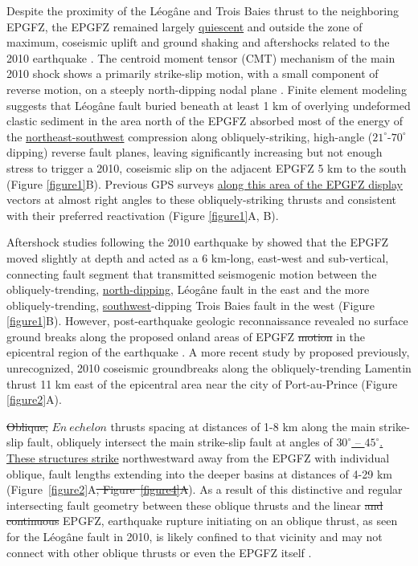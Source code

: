 \documentclass[linenumbers,draft]{agujournal}
\begin{document}
Despite the proximity of the L\'eog\^ane and Trois Baies thrust to the neighboring EPGFZ, the EPGFZ remained largely \ul{quiescent} and outside the zone of maximum, coseismic uplift and ground shaking and aftershocks related to the 2010 earthquake \citep{nettles2010earthquake}. The centroid moment tensor (CMT) mechanism of the main 2010 shock shows a primarily strike-slip motion, with a small component of reverse motion, on a steeply north-dipping nodal plane \citep{nettles2010earthquake,douilly2013crustal}. Finite element modeling \citep{douilly2015three} suggests that L\'eog\^ane fault buried beneath at least 1 km of overlying undeformed clastic sediment in the area north of the EPGFZ absorbed most of the energy of the \ul{northeast-southwest} compression along obliquely-striking, high-angle ($21^{\circ}$-$70^{\circ}$ dipping) reverse fault planes, leaving significantly increasing but not enough stress to trigger a 2010, coseismic slip on the adjacent EPGFZ 5 km to the south (Figure \ref{figure1}B). Previous GPS surveys \underline{\citep{calais2010transpressional,calais2016plate}}\ul{ along this area of the EPGFZ display} vectors at almost right angles to these obliquely-striking thrusts and consistent with their preferred reactivation (Figure \ref{figure1}A, B).

Aftershock studies following the 2010 earthquake by \citet{douilly2013crustal,douilly2015three} showed that the EPGFZ moved slightly at depth and acted as a 6 km-long, east-west and sub-vertical, connecting fault segment that transmitted seismogenic motion between the obliquely-trending, \ul{north-dipping}, L\'eog\^ane fault in the east and the more obliquely-trending, \ul{southwest}-dipping Trois Baies fault in the west (Figure \ref{figure1}B). However, post-earthquake geologic reconnaissance revealed no surface ground breaks along the proposed onland areas of EPGFZ \st{motion} in the epicentral region of the earthquake \citep{prentice2010seismic,koehler2011field,rathje2014geotechnical}. A more recent study by \citet{saint2015seismotectonics} proposed previously, unrecognized, 2010 coseismic groundbreaks along the obliquely-trending Lamentin thrust 11 km east of the epicentral area near the city of Port-au-Prince (Figure \ref{figure2}A).

\st{Oblique, }$En~echelon$ thrusts spacing at distances of 1-8 km along the main strike-slip fault, obliquely intersect the main strike-slip fault at angles of \ul{$30^{\circ}$ -- $45^{\circ}$. These structures strike} northwestward away from the EPGFZ with individual oblique, fault lengths extending into the deeper basins at distances of 4-29 km (Figure~\ref{figure2}A\st{, Figure~{\ref{figure4}}A}).  As a result of this distinctive and regular intersecting fault geometry between these oblique thrusts and the linear \st{and continuous} EPGFZ, earthquake rupture initiating on an oblique thrust, as seen for the L\'eog\^ane fault in 2010, is likely confined to that vicinity and may not connect with other oblique thrusts or even the EPGFZ itself \citep{douilly2013crustal,douilly2015three}.
\end{document}
